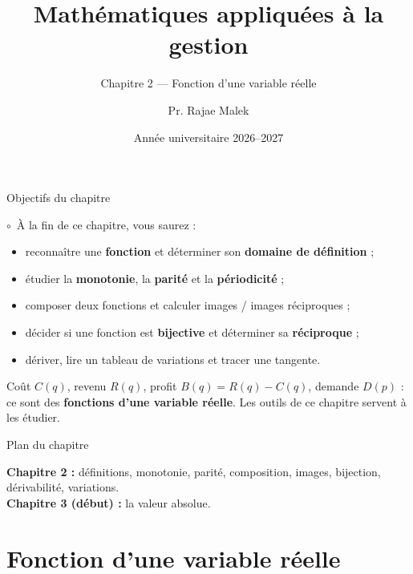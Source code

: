 \documentclass[aspectratio=169,11pt]{beamer}
\title{\vspace{1.35cm}Mathématiques appliquées à la gestion}
\subtitle{Chapitre 2 --- Fonction d'une variable réelle}
\author{Pr. Rajae Malek}
\institute{Business School -- Université Mundiapolis}
\date{Année universitaire 2026--2027}
\providecommand{\faBullseye}{$\circ$}
\newcommand{\key}[1]{\textbf{\color{DarkBlue}#1}}
\begin{document}
\maketitle

\begin{frame}[shrink=5]{Objectifs du chapitre}
	\begin{applicationbox}
		\faBullseye\ À la fin de ce chapitre, vous saurez :
		\begin{itemize}
			\item reconnaître une \key{fonction} et déterminer son \key{domaine de définition} ;
			\item étudier la \key{monotonie}, la \key{parité} et la \key{périodicité} ;
			\item composer deux fonctions et calculer images / images réciproques ;
			\item décider si une fonction est \key{bijective} et déterminer sa \key{réciproque} ;
			\item dériver, lire un tableau de variations et tracer une tangente.
		\end{itemize}
	\end{applicationbox}
	\vspace{0.25cm}
	\begin{exemplebox}[En gestion]
		Coût $C(q)$, revenu $R(q)$, profit $B(q)=R(q)-C(q)$, demande $D(p)$ : ce sont des
		\key{fonctions d'une variable réelle}. Les outils de ce chapitre servent à les étudier.
	\end{exemplebox}
\end{frame}

\begin{frame}{Plan du chapitre}
	\tableofcontents[sections={2-3},hideallsubsections]
	\vspace{0.3cm}
	\begin{applicationbox}
		\textbf{Chapitre 2 :} définitions, monotonie, parité, composition,
		images, bijection, dérivabilité, variations.\\
		\textbf{Chapitre 3 (début) :} la valeur absolue.
	\end{applicationbox}
\end{frame}

\setcounter{section}{1}
\section{Fonction d'une variable réelle}
\end{document}
